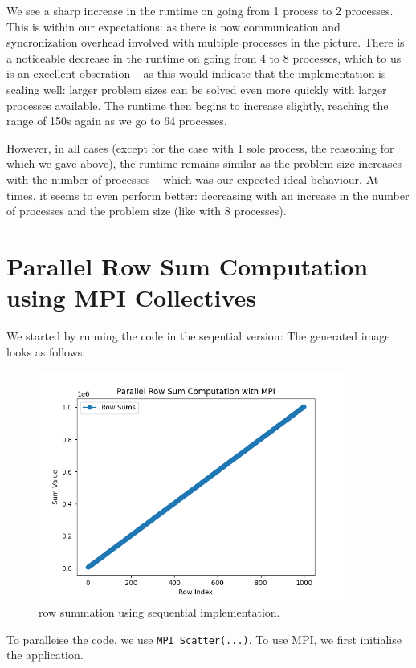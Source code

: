 \documentclass[a4paper,10pt]{article}
\begin{document}
We see a sharp increase in the runtime on going from 1 process to 2 processes. This is within our expectations: as there is now communication and syncronization overhead involved with multiple processes in the picture. There is a noticeable decrease in the runtime on going from 4 to 8 processes, which to us is an excellent obseration -- as this would indicate that the implementation is scaling well: larger problem sizes can be solved even more quickly with larger processes available. The runtime then begins to increase slightly, reaching the range of 150s again as we go to 64 processes. 

However, in all cases (except for the case with 1 sole process, the reasoning for which we gave above), the runtime remains similar as the problem size increases with the number of processes -- which was our expected ideal behaviour. At times, it seems to even perform better: decreasing with an increase in the number of processes and the problem size (like with 8 processes). 

\section{Parallel Row Sum Computation using MPI Collectives}
We started by running the code in the seqential version:
The generated image looks as follows:
\begin{figure}[H]
  \centering
  \includegraphics[width=0.9\textwidth]{img/ex2_seq}
  \caption{row summation using sequential implementation.}
  \label{fig:ex2_seq}
\end{figure}

To paralleise the code, we use \verb|MPI_Scatter(...)|.
To use MPI, we first initialise the application.
\end{document}
